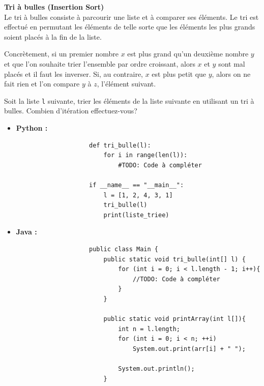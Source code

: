 \begin{Exercice} [20 minutes] \textbf{Tri à bulles (Insertion Sort)} \\
Le tri à bulles consiste à parcourir une liste et à comparer ses éléments. Le tri est effectué en permutant les éléments de telle sorte que les éléments les plus grands soient placés à la fin de la liste. 

Concrètement, si un premier nombre $x$ est plus grand qu'un deuxième nombre $y$ et que l'on souhaite trier l'ensemble par ordre croissant, alors $x$ et $y$ sont mal placés et il faut les inverser. Si, au contraire, $x$ est plus petit que $y$, alors on ne fait rien et l'on compare $y$ à $z$, l'élément suivant.

Soit la liste \lstinline{l} suivante, trier les éléments de la liste suivante en utilisant un tri à bulles. Combien d'itération effectuez-vous?

\begin{itemize}
        \item \textbf{Python :}
                \begin{verbatim}
                    def tri_bulle(l):
                        for i in range(len(l)):
                            #TODO: Code à compléter
                    
                    if __name__ == "__main__":
                        l = [1, 2, 4, 3, 1]
                        tri_bulle(l)
                        print(liste_triee)
                \end{verbatim}
        \item \textbf{Java :}
                \begin{verbatim}
                    public class Main {
                        public static void tri_bulle(int[] l) {
                            for (int i = 0; i < l.length - 1; i++){
                                //TODO: Code à compléter 
                            }
                        }
                        
                        public static void printArray(int l[]){ 
                            int n = l.length; 
                            for (int i = 0; i < n; ++i) 
                                System.out.print(arr[i] + " "); 
                      
                            System.out.println(); 
                        } 
              

\end{verbatim}
\end{itemize}
\end{Exercice}
